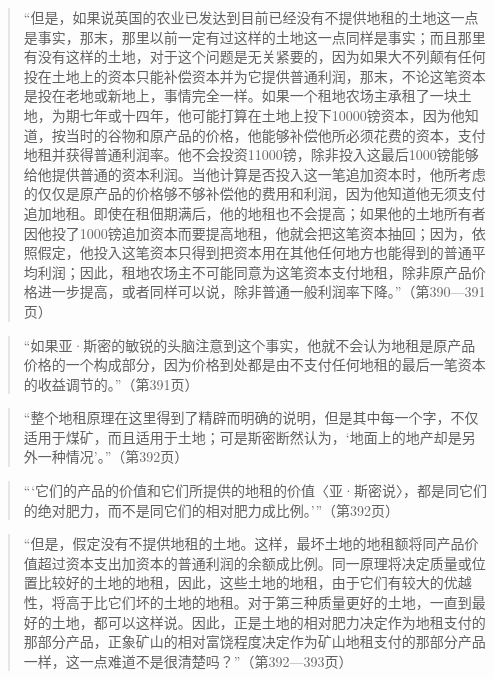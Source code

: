 \begin{quote}“但是，如果说英国的农业已发达到目前已经没有不提供地租的土地这一点是事实，那末，那里以前一定有过这样的土地这一点同样是事实；而且那里有没有这样的土地，对于这个问题是无关紧要的，因为如果大不列颠有任何投在土地上的资本只能补偿资本并为它提供普通利润，那末，不论这笔资本是投在老地或新地上，事情完全一样。如果一个租地农场主承租了一块土地，为期七年或十四年，他可能打算在土地上投下10000镑资本，因为他知道，按当时的谷物和原产品的价格，他能够补偿他所必须花费的资本，支付地租并获得普通利润率。他不会投资11000镑，除非投入这最后1000镑能够给他提供普通的资本利润。当他计算是否投入这一笔追加资本时，他所考虑的仅仅是原产品的价格够不够补偿他的费用和利润，因为他知道他无须支付追加地租。即使在租佃期满后，他的地租也不会提高；如果他的土地所有者因他投了1000镑追加资本而要提高地租，他就会把这笔资本抽回；因为，依照假定，他投入这笔资本只得到把资本用在其他任何地方也能得到的普通平均利润；因此，租地农场主不可能同意为这笔资本支付地租，除非原产品价格进一步提高，或者同样可以说，除非普通一般利润率下降。”（第390—391页）\end{quote}

\begin{quote}“如果亚·斯密的敏锐的头脑注意到这个事实，他就不会认为地租是原产品价格的一个构成部分，因为价格到处都是由不支付任何地租的最后一笔资本的收益调节的。”（第391页）\end{quote}

\begin{quote}“整个地租原理在这里得到了精辟而明确的说明，但是其中每一个字，不仅适用于煤矿，而且适用于土地；可是斯密断然认为，‘地面上的地产却是另外一种情况’。”（第392页）\end{quote}

\begin{quote}“‘它们的产品的价值和它们所提供的地租的价值〈亚·斯密说〉，都是同它们的绝对肥力，而不是同它们的相对肥力成比例。’”（第392页）\end{quote}

\begin{quote}“但是，假定没有不提供地租的土地。这样，最坏土地的地租额将同产品价值超过资本支出加资本的普通利润的余额成比例。同一原理将决定质量或位置比较好的土地的地租，因此，这些土地的地租，由于它们有较大的优越性，将高于比它们坏的土地的地租。对于第三种质量更好的土地，一直到最好的土地，都可以这样说。因此，正是土地的相对肥力决定作为地租支付的那部分产品，正象矿山的相对富饶程度决定作为矿山地租支付的那部分产品一样，这一点难道不是很清楚吗？”（第392—393页）\end{quote}


